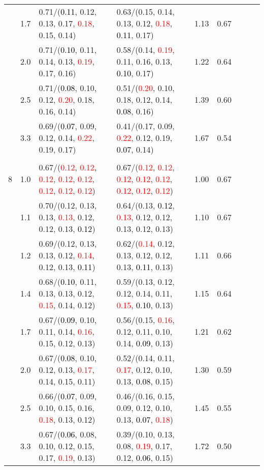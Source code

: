 \documentclass[10pt,a4paper]{report}
\begin{document}
\begin{table}[!htbp]
\begin{center}
{\begin{tabular}{ccllccccc}
			&1.7&0.71/(\textcolor{black}{0.11}, 0.12, 0.13, 0.17, \textcolor{red}{0.18}, 0.15, 0.14)&0.63/(0.15, 0.14, 0.13, 0.12, \textcolor{red}{0.18}, \textcolor{black}{0.11}, 0.17)&1.13&0.67\\
			&2.0&0.71/(\textcolor{black}{0.10}, 0.11, 0.14, 0.13, \textcolor{red}{0.19}, 0.17, 0.16)&0.58/(0.14, \textcolor{red}{0.19}, 0.11, 0.16, 0.13, \textcolor{black}{0.10}, 0.17)&1.22&0.64\\
			&2.5&0.71/(\textcolor{black}{0.08}, 0.10, 0.12, \textcolor{red}{0.20}, 0.18, 0.16, 0.14)&0.51/(\textcolor{red}{0.20}, 0.10, 0.18, 0.12, 0.14, \textcolor{black}{0.08}, 0.16)&1.39&0.60\\
			&3.3&0.69/(\textcolor{black}{0.07}, 0.09, 0.12, 0.14, \textcolor{red}{0.22}, 0.19, 0.17)&0.41/(0.17, 0.09, \textcolor{red}{0.22}, 0.12, 0.19, \textcolor{black}{0.07}, 0.14)&1.67&0.54\\
			&&&&\\
			8			&1.0&0.67/(\textcolor{red}{0.12}, \textcolor{red}{0.12}, \textcolor{red}{0.12}, \textcolor{red}{0.12}, \textcolor{red}{0.12}, \textcolor{red}{0.12}, \textcolor{red}{0.12}, \textcolor{red}{0.12})&0.67/(\textcolor{red}{0.12}, \textcolor{red}{0.12}, \textcolor{red}{0.12}, \textcolor{red}{0.12}, \textcolor{red}{0.12}, \textcolor{red}{0.12}, \textcolor{red}{0.12}, \textcolor{red}{0.12})&1.00&0.67\\
			&1.1&0.70/(0.12, 0.13, 0.13, \textcolor{red}{0.13}, 0.12, 0.12, 0.13, \textcolor{black}{0.12})&0.64/(0.13, \textcolor{black}{0.12}, \textcolor{red}{0.13}, 0.12, 0.12, 0.13, 0.12, 0.13)&1.10&0.67\\
			&1.2&0.69/(0.12, 0.13, 0.13, 0.12, \textcolor{red}{0.14}, 0.12, 0.13, \textcolor{black}{0.11})&0.62/(\textcolor{red}{0.14}, 0.12, 0.13, 0.12, 0.12, 0.13, \textcolor{black}{0.11}, 0.13)&1.11&0.66\\
			&1.4&0.68/(\textcolor{black}{0.10}, 0.11, 0.13, 0.13, 0.12, \textcolor{red}{0.15}, 0.14, 0.12)&0.59/(0.13, 0.12, 0.12, 0.14, 0.11, \textcolor{red}{0.15}, \textcolor{black}{0.10}, 0.13)&1.15&0.64\\
			&1.7&0.67/(\textcolor{black}{0.09}, 0.10, 0.11, 0.14, \textcolor{red}{0.16}, 0.15, 0.12, 0.13)&0.56/(0.15, \textcolor{red}{0.16}, 0.12, 0.11, 0.10, 0.14, \textcolor{black}{0.09}, 0.13)&1.21&0.62\\
			&2.0&0.67/(\textcolor{black}{0.08}, 0.10, 0.12, 0.13, \textcolor{red}{0.17}, 0.14, 0.15, 0.11)&0.52/(0.14, 0.11, \textcolor{red}{0.17}, 0.12, 0.10, 0.13, \textcolor{black}{0.08}, 0.15)&1.30&0.59\\
			&2.5&0.66/(\textcolor{black}{0.07}, 0.09, 0.10, 0.15, 0.16, \textcolor{red}{0.18}, 0.13, 0.12)&0.46/(0.16, 0.15, 0.09, 0.12, 0.10, 0.13, \textcolor{black}{0.07}, \textcolor{red}{0.18})&1.45&0.55\\
			&3.3&0.67/(\textcolor{black}{0.06}, 0.08, 0.10, 0.12, 0.15, 0.17, \textcolor{red}{0.19}, 0.13)&0.39/(0.10, 0.13, 0.08, \textcolor{red}{0.19}, 0.17, 0.12, \textcolor{black}{0.06}, 0.15)&1.72&0.50\\
			\bottomrule
		\end{tabular}}
	\end{center}
\end{table}
\end{document}
